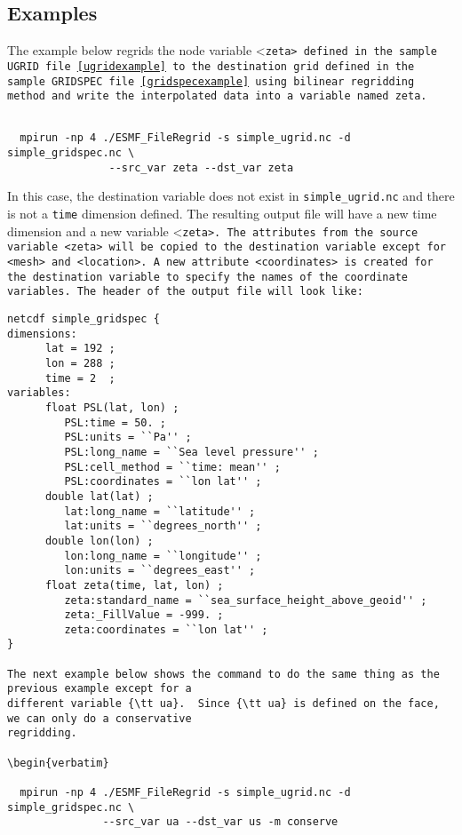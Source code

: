 \subsection{Examples}

The example below regrids the node variable <\tt zeta> defined in the sample UGRID file~\ref{ugridexample} to 
the destination grid defined in the sample GRIDSPEC file~\ref{gridspecexample} using bilinear regridding
method and write the interpolated data into a variable named {\tt zeta}.  

\begin{verbatim}

  mpirun -np 4 ./ESMF_FileRegrid -s simple_ugrid.nc -d simple_gridspec.nc \
                --src_var zeta --dst_var zeta

\end{verbatim}

In this case, the destination variable does not exist in {\tt simple\_ugrid.nc} and there is not a {\tt time}
dimension defined.  The resulting output file will have a new time dimension and a new variable <\tt zeta>.
The attributes from the source variable <\tt zeta> will be copied to the destination variable except for 
<\tt mesh> and <\tt location>.  A new attribute <\tt coordinates> is created for the destination variable to
specify the names of the coordinate variables.  The header of the output file will look like:

\begin{verbatim}
netcdf simple_gridspec {
dimensions:
      lat = 192 ;
      lon = 288 ;
      time = 2  ;
variables:
      float PSL(lat, lon) ;
         PSL:time = 50. ;
         PSL:units = ``Pa'' ;
         PSL:long_name = ``Sea level pressure'' ;
         PSL:cell_method = ``time: mean'' ;
         PSL:coordinates = ``lon lat'' ;
      double lat(lat) ;
         lat:long_name = ``latitude'' ;
         lat:units = ``degrees_north'' ;
      double lon(lon) ;
         lon:long_name = ``longitude'' ;
         lon:units = ``degrees_east'' ;
      float zeta(time, lat, lon) ;
         zeta:standard_name = ``sea_surface_height_above_geoid'' ;
         zeta:_FillValue = -999. ;
         zeta:coordinates = ``lon lat'' ;
}
  
The next example below shows the command to do the same thing as the previous example except for a 
different variable {\tt ua}.  Since {\tt ua} is defined on the face, we can only do a conservative 
regridding.

\begin{verbatim}

  mpirun -np 4 ./ESMF_FileRegrid -s simple_ugrid.nc -d simple_gridspec.nc \
               --src_var ua --dst_var us -m conserve

\end{verbatim}


